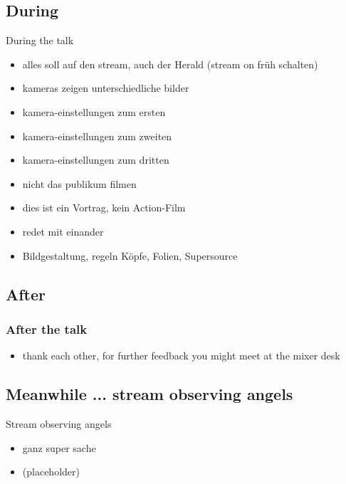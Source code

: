 \documentclass[hyperref={pdfpagelabels=false},aspectratio=169]{beamer}
\begin{document}
\subsection{During} %
\begin{frame}{During the talk}
\begin{itemize}
\item alles soll auf den stream, auch der Herald (stream on früh schalten)
\item  kameras zeigen unterschiedliche bilder 
\item  kamera-einstellungen zum ersten
\item  kamera-einstellungen zum zweiten
\item  kamera-einstellungen zum dritten
\item  nicht das publikum filmen
\item  dies ist ein Vortrag, kein Action-Film 
\item  redet mit einander 
\item  Bildgestaltung, regeln  Köpfe, Folien, Supersource
\end{itemize} 
\end{frame}




\subsection{After} %
\begin{frame}
\frametitle{After the talk}
\begin{itemize}
\item thank each other, for further feedback you might meet at the mixer desk
\end{itemize} 
\end{frame}


\subsection{Meanwhile ... stream observing angels} %
\begin{frame}{Stream observing angels}
\begin{itemize}
\item  ganz super sache
\item  (placeholder)
\end{itemize} 
\end{frame}
\end{document}

